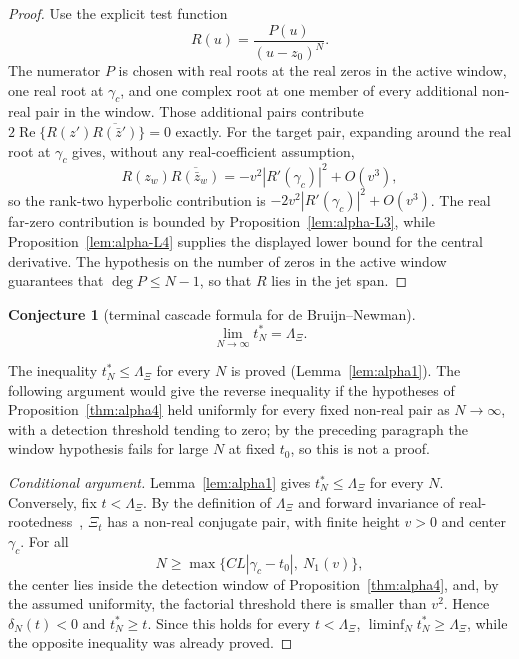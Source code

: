 \documentclass[11pt]{amsart}
\newtheorem{conjecture}[theorem]{Conjecture}
\theoremstyle{definition}
\theoremstyle{remark}
\theoremstyle{definition}
\renewcommand{\Re}{\operatorname{Re}}
\begin{document}
\begin{proof}
Use the explicit test function
\[
   R(u)=\frac{P(u)}{(u-z_0)^N}.
\]
The numerator $P$ is chosen with real roots at the real zeros in the active window, one real root at
$\gamma_c$, and one complex root at one member of every additional non-real pair in the window.
Those additional pairs contribute
$2\Re\{R(z')\overline{R(\bar z')}\}=0$ exactly.  For the target pair, expanding around the real
root at $\gamma_c$ gives, without any real-coefficient assumption,
\[
   R(z_w)\overline{R(\bar z_w)}
   =
   -v^2|R'(\gamma_c)|^2+O(v^3),
\]
so the rank-two hyperbolic contribution is
$-2v^2|R'(\gamma_c)|^2+O(v^3)$.  The real far-zero contribution is bounded by
Proposition~\ref{lem:alpha-L3}, while Proposition~\ref{lem:alpha-L4} supplies the displayed lower bound for the
central derivative.  The hypothesis on the number of zeros in the active window guarantees that
$\deg P\le N-1$, so that $R$ lies in the jet span.
\end{proof}

\begin{conjecture}[terminal cascade formula for de Bruijn--Newman]\label{thm:alpha5}
\label{thm:cascade-main}
\[
   \lim_{N\to\infty}t_N^*=\Lambda_\Xi.
\]
\end{conjecture}

\noindent The inequality $t_N^*\le\Lambda_\Xi$ for every $N$ is proved (Lemma~\ref{lem:alpha1}).
The following argument would give the reverse inequality if the hypotheses of
Proposition~\ref{thm:alpha4} held uniformly for every fixed non-real pair as $N\to\infty$, with a
detection threshold tending to zero; by the preceding paragraph the window hypothesis fails for large $N$
at fixed $t_0$, so this is not a proof.

\begin{proof}[Conditional argument]
Lemma~\ref{lem:alpha1} gives $t_N^*\le\Lambda_\Xi$ for every $N$.  Conversely, fix
$t<\Lambda_\Xi$.  By the definition of $\Lambda_\Xi$ and forward invariance of
real-rootedness~\cite{deBruijn}, $\Xi_t$ has a non-real conjugate pair, with finite
height $v>0$ and center $\gamma_c$.  For all
\[
   N\ge \max\{C L|\gamma_c-t_0|,\ N_1(v)\},
\]
the center lies inside the detection window of Proposition~\ref{thm:alpha4}, and, by the assumed
uniformity, the factorial threshold
there is smaller than $v^2$.  Hence $\delta_N(t)<0$ and $t_N^*\ge t$.  Since this holds for every
$t<\Lambda_\Xi$, $\liminf_N t_N^*\ge\Lambda_\Xi$, while the opposite inequality was already
proved.
\end{proof}
\end{document}
